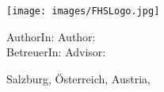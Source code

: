 \begin{titlepage}
\else %

    \begin{center}
    
    \texttt{[image: images/FHSLogo.jpg]}


    \vspace*{4cm}
    
    \fontsize{20.79}{18pt}{\selectfont        
    	\textit{\textbf{\titlename}}
    }
    
    \vspace*{4cm}
    
    \fontsize{20.79}{18pt}{%
    \ifmmtlanguagegerman
    	\textbf{Bachelorarbeit \ifmmtpaper 1 \else 2 \fi }
    \else
        \textbf{Bachelor Thesis \ifmmtpaper 1 \else 2 \fi }
    \fi
    }
    
    
    \end{center}
    
    \vfill
    
    \ifmmtlanguagegerman AuthorIn: \else Author: \fi  \authorname  \\
    \ifmmtlanguagegerman BetreuerIn: \else Advisor: \fi \advisor \\
    
    Salzburg, \ifmmtlanguagegerman Österreich, \else Austria, \fi \thesisdate
    
    
    

\fi

\end{titlepage}
